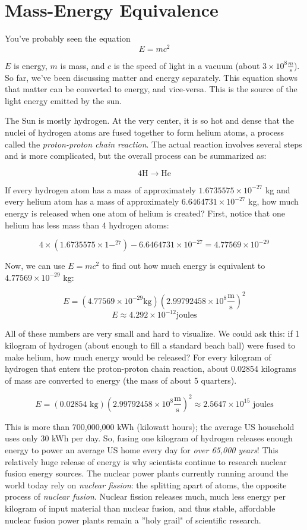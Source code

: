\section{Mass-Energy Equivalence}
You've probably seen the equation
$$E = mc^2$$

$E$ is energy, $m$ is mass, and $c$ is the speed of light in a vacuum (about $3 
\times 10^8 \frac{m}{s}$). So far, we've been discussing matter and energy 
separately. This equation shows that matter can be converted to energy, and 
vice-versa. This is the source of the light energy emitted by the sun. 

The Sun is mostly hydrogen. At the very center, it is so hot and dense that the 
nuclei of hydrogen atoms are fused together to form helium atoms, a process 
called the \textit{proton-proton chain reaction}. The actual reaction involves several 
steps and is more complicated, but the overall process can be summarized as:

$$4\text{H} \to \text{He}$$

If every hydrogen atom has a mass of approximately $1.6735575 \times 10^{-27}$ kg 
and every helium atom has a mass of approximately $6.6464731 \times 10^{-27}$ kg, 
how much energy is released when one atom of helium is created? First, notice 
that one helium has less mass than 4 hydrogen atoms:

$$4 \times \left( 1.6735575 \times 1-^{27} \right) - 6.6464731 \times 10^{-27} = 
4.77569 \times 10^{-29}$$

Now, we can use $E = mc^2$ to find out how much energy is equivalent to $4.77569 
\times 10^{-29}$ kg:

$$E = \left( 4.77569 \times 10^{-29} \text{kg} \right) \left( 2.99792458 \times 
10^8 \frac{\text{m}}{\text{s}} \right)^2$$
$$E \approx 4.292 \times 10^{-12} \text{joules}$$

All of these numbers are very small and hard to visualize. We could ask this: if 
1 kilogram of hydrogen (about enough to fill a standard beach ball) were fused to 
make helium, how much energy would be released? For every kilogram of hydrogen 
that enters the proton-proton chain reaction, about 0.02854 kilograms of mass are 
converted to energy (the mass of about 5 quarters).

$$E = \left( 0.02854 \text{ kg} \right) \left( 2.99792458 \times 10^8 \frac{
\text{m}}{\text{s}} \right)^2 \approx 2.5647 \times 10^{15} \text{ joules}$$

This is more than 700,000,000 kWh (kilowatt hours); the average US household 
uses only 30 kWh per day. So, fusing one kilogram of hydrogen releases enough energy 
to power an average US home every day for \textit{over 65,000 years}! This 
relatively huge release of energy is why scientists continue to research nuclear 
fusion energy sources. The nuclear power plants currently running around the world 
today rely on \textit{nuclear fission}: the splitting apart of atoms, the opposite 
process of \textit{nuclear fusion}. Nuclear fission releases much, much less energy 
per kilogram of input material than nuclear fusion, and thus stable, affordable 
nuclear fusion power plants remain a ''holy grail" of scientific research. 

